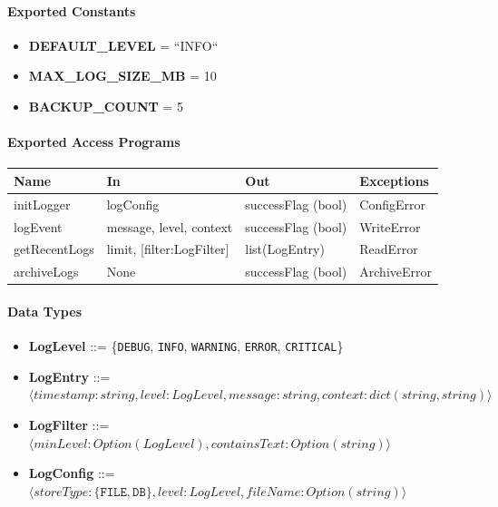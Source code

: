 \documentclass[12pt, titlepage]{article}
\begin{document}
\begin{itemize}
  \paragraph{Exported Constants}
  \begin{itemize}
    \item \textbf{DEFAULT\_LEVEL} = ``INFO``
    \item \textbf{MAX\_LOG\_SIZE\_MB} = 10
    \item \textbf{BACKUP\_COUNT} = 5
  \end{itemize}

  \paragraph{Exported Access Programs}
  \begin{center}
  \renewcommand{\arraystretch}{1.2}
  \begin{tabularx}{\textwidth}{l X X l}
  \toprule
  \textbf{Name} & \textbf{In} & \textbf{Out} & \textbf{Exceptions}\\
  \midrule
  initLogger & logConfig & successFlag (bool)& ConfigError \\
  logEvent & message, level, context & successFlag (bool)& WriteError \\
  getRecentLogs & limit, [filter:LogFilter] & list(LogEntry) & ReadError \\
  archiveLogs & None & successFlag (bool)& ArchiveError \\
  \bottomrule
  \end{tabularx}
  \end{center}

  \paragraph{Data Types}
  \begin{itemize}
    \item \textbf{LogLevel} ::= \{\texttt{DEBUG}, \texttt{INFO}, \texttt{WARNING}, \texttt{ERROR}, \texttt{CRITICAL}\}
    \item \textbf{LogEntry} ::= $\langle timestamp:string, level:LogLevel, message:string, context:dict(string,string) \rangle$
    \item \textbf{LogFilter} ::= $\langle minLevel:Option(LogLevel), containsText:Option(string) \rangle$
    \item \textbf{LogConfig} ::= $\langle storeType:\{\texttt{FILE},\texttt{DB}\}, level:LogLevel, fileName:Option(string) \rangle$
  \end{itemize}


\end{itemize}
\end{document}

